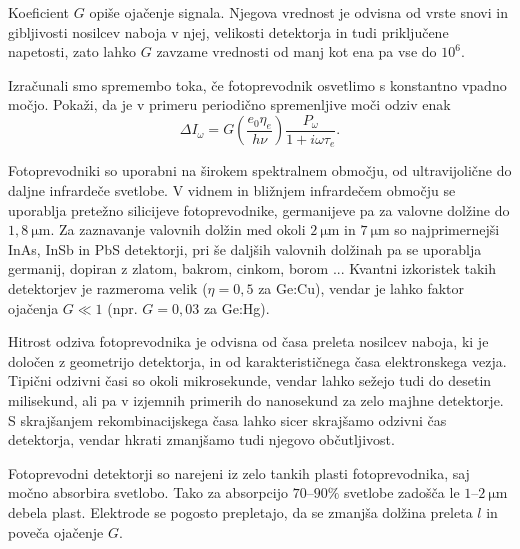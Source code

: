 Koeficient $G$ opiše ojačenje signala. Njegova vrednost je odvisna od 
vrste snovi in gibljivosti nosilcev naboja v njej, velikosti
detektorja in tudi priključene napetosti, zato lahko $G$ zavzame vrednosti od manj kot ena pa
vse do $10^6$. 

\begin{definition}
Izračunali smo spremembo toka, če fotoprevodnik osvetlimo s konstantno vpadno močjo. Pokaži, da
 je v primeru periodično spremenljive moči odziv enak
 \begin{equation}
\Delta I_\omega = G \left( \frac{e_0 \eta_e}{h\nu}\right) \frac{P_\omega}{1+i \omega \tau_e}.
 \end{equation}
 
\end{definition}

Fotoprevodniki so uporabni na širokem spektralnem območju, od ultra\-vijolične 
do daljne infra\-rdeče svetlobe. 
V vidnem in bližnjem infrardečem območju se 
uporablja pretežno silicijeve fotoprevodnike, germanijeve
pa za valovne dolžine do $1,8~\si{\micro\meter}$. Za zaznavanje valovnih dolžin med okoli 
$2~\si{\micro\meter}$ in $7~\si{\micro\meter}$ so najprimernejši InAs, InSb in PbS detektorji, 
pri še daljših valovnih dolžinah pa se uporablja germanij, dopiran z zlatom, bakrom, cinkom, borom ...
Kvantni izkoristek takih detektorjev je razmeroma velik ($\eta = 0,5$ za Ge:Cu), vendar
je lahko faktor ojačenja $G \ll 1$ (npr. $G = 0,03$ za Ge:Hg). 

Hitrost odziva fotoprevodnika je odvisna od časa preleta nosilcev naboja,
ki je določen z geometrijo detektorja, in od karakterističnega časa elektronskega vezja. 
Tipični odzivni časi so okoli mikrosekunde, vendar lahko sežejo
tudi do desetin milisekund, ali pa v izjemnih primerih do nanosekund za zelo majhne detektorje.
S skrajšanjem rekombinacijskega časa lahko sicer skrajšamo odzivni čas detektorja, 
vendar hkrati zmanjšamo tudi njegovo občutljivost.

\begin{remark}
Fotoprevodni detektorji so narejeni iz zelo tankih plasti fotoprevodnika, saj močno absorbira
svetlobo. Tako za absorpcijo $70$--$90\%$ svetlobe zadošča le $1$--$2~\si{\micro\meter}$ debela plast.
Elektrode se pogosto prepletajo, da se zmanjša dolžina preleta $l$ in poveča ojačenje $G$. 
\end{remark}

